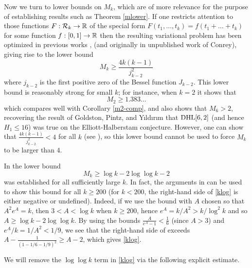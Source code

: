 Now we turn to lower bounds on $M_k$, which are of more relevance for the purpose of establishing results such as Theorem \ref{mlower}.  If one restricts attention to those functions $F: {\mathcal R}_k \to \mathbb{R}$ of the special form $F(t_1,\dots,t_k) = f(t_1+\dots+t_k)$ for some function $f: [0,1] \to \mathbb{R}$ then the resulting variational problem has been optimized in previous works \cite{revesz}, \cite{polymath8a} (and originally in unpublished work of Conrey), giving rise to the lower bound
$$ M_k \geq \frac{4k(k-1)}{j_{k-2}^2}$$
where $j_{k-2}$ is the first positive zero of the Bessel function $J_{k-2}$.  This lower bound is reasonably strong for small $k$; for instance, when $k=2$ it shows that
$$ M_2 \geq 1.383\dots$$
which compares well with Corollary \ref{m2-comp}, and also shows that $M_6 > 2$, recovering the result of Goldston, Pintz, and Y{\i}ld{\i}r{\i}m that $\operatorname*{DHL}[6,2]$ (and hence $H_1 \leq 16$) was true on the Elliott-Halberstam conjecture.  However, one can show that $\frac{4k(k-1)}{j_{k-2}^2} < 4$ for all $k$ (see \cite{sound}), so this lower bound cannot be used to force $M_k$ to be larger than $4$.

In \cite{maynard-new} the lower bound
\begin{equation}\label{klog}
 M_k \geq \log k - 2\log\log k - 2
\end{equation}
was established for all sufficiently large $k$.  In fact, the arguments in \cite{maynard-new} can be used to show this bound for all $k \geq 200$ (for $k<200$, the right-hand side of \eqref{klog} is either negative or undefined).  Indeed, if we use the bound \cite[(7.19)]{maynard-new} with $A$ chosen so that $A^2 e^A = k$, then $3 < A < \log k$ when $k \geq 200$, hence $e^A = k/A^2 > k / \log^2 k$ and so $A \geq \log k - 2 \log\log k$.  By using the bounds $\frac{A}{e^A-1} < \frac{1}{6}$ (since $A >3$) and $e^A/k = 1/A^2 < 1/9$, we see that the right-hand side of \cite[(8.17)]{maynard-new} exceeds $A - \frac{1}{(1-1/6 - 1/9)^2} \geq A-2$, which gives \eqref{klog}.

We will remove the $\log\log k$ term in \eqref{klog} via the following explicit estimate.


